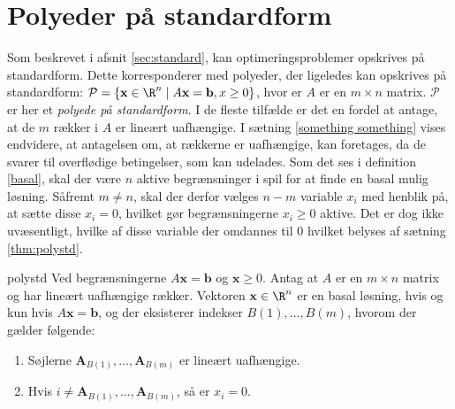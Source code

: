 \section{Polyeder på standardform}
\label{afsnit:fisk}
%
Som beskrevet i afsnit \ref{sec:standard}, kan optimeringsproblemer opskrives på standardform.
Dette korresponderer med polyeder, der ligeledes kan opskrives på standardform: 
$\mathcal{P}=\{ \mathbf{x} \in \R^n \mid A\mathbf{x}=\mathbf{b},x \geq 0 \}$, hvor er $A$ er en $m \times n$ matrix.
$\mathcal{P}$ er her et \textit{polyede på standardform}.
I de fleste tilfælde er det en fordel at antage, at de $m$ rækker i $A$ er lineært uafhængige.
I sætning \ref{something something} vises endvidere, at antagelsen om, at rækkerne er uafhængige, kan foretages, da de svarer til overflødige betingelser, som kan udelades.
Som det ses i definition \ref{basal}, skal der være $n$ aktive begrænsninger i spil for at finde en basal mulig løsning.
Såfremt $m \neq n$, skal der derfor vælges $n-m$ variable $x_i$ med henblik på, at sætte disse $x_i=0$, hvilket gør begrænsningerne $x_i \geq 0$ aktive.
Det er dog ikke uvæsentligt, hvilke af disse variable der omdannes til $0$ hvilket belyses af sætning \ref{thm:polystd}.
%
\begin{thm}{}{polystd}
Ved begrænsningerne $A\mathbf{x}=\mathbf{b}$ og $\mathbf{x}\geq 0$.
Antag at $A$ er en $m \times n$ matrix og har lineært uafhængige rækker.
Vektoren $\mathbf{x} \in \R^n$ er en basal løsning, hvis og kun hvis $A\mathbf{x}=\mathbf{b}$, og der eksisterer indekser $B(1),\ldots,B(m)$, hvorom der gælder følgende:
\begin{enumerate}[label=(\alph*)]
\item Søjlerne $\mathbf{A}_{B(1)},\ldots,\mathbf{A}_{B(m)}$ er lineært uafhængige.
\item Hvis $i \neq \mathbf{A}_{B(1)},\ldots,\mathbf{A}_{B(m)}$, så er $x_i=0$.
\end{enumerate}
\end{thm}
